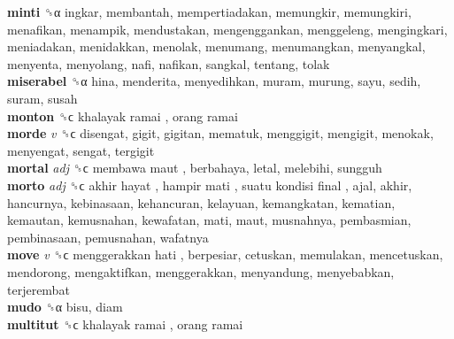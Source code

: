 \textbf{minti} ␝α  ingkar, membantah, mempertiadakan, memungkir, memungkiri, menafikan, menampik, mendustakan, mengenggankan, menggeleng, mengingkari, meniadakan, menidakkan, menolak, menumang, menumangkan, menyangkal, menyenta, menyolang, nafi, nafikan, sangkal, tentang, tolak  \\
\textbf{miserabel} ␝α  hina, menderita, menyedihkan, muram, murung, sayu, sedih, suram, susah  \\
\textbf{monton} ␝ϲ   khalayak ramai ,  orang ramai   \\
\textbf{morde} \emph{v}  ␝ϲ  disengat, gigit, gigitan, mematuk, menggigit, mengigit, menokak, menyengat, sengat, tergigit  \\
\textbf{mortal} \emph{adj}  ␝ϲ   membawa maut , berbahaya, letal, melebihi, sungguh  \\
\textbf{morto} \emph{adj}  ␝ϲ   akhir hayat ,  hampir mati ,  suatu kondisi final , ajal, akhir, hancurnya, kebinasaan, kehancuran, kelayuan, kemangkatan, kematian, kemautan, kemusnahan, kewafatan, mati, maut, musnahnya, pembasmian, pembinasaan, pemusnahan, wafatnya  \\
\textbf{move} \emph{v}  ␝ϲ   menggerakkan hati , berpesiar, cetuskan, memulakan, mencetuskan, mendorong, mengaktifkan, menggerakkan, menyandung, menyebabkan, terjerembat  \\
\textbf{mudo} ␝α  bisu, diam  \\
\textbf{multitut} ␝ϲ   khalayak ramai ,  orang ramai   \\
